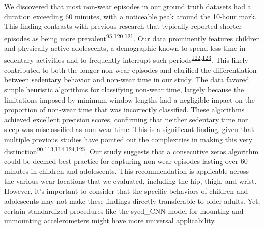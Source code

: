 \documentclass[
  9pt,
]{scrbook}
\begin{document}
We discovered that most non-wear episodes in our ground truth datasets
had a duration exceeding 60 minutes, with a noticeable peak around the
10-hour mark. This finding contrasts with previous research that
typically reported shorter episodes as being more
prevalent\textsuperscript{\protect\hyperlink{ref-jaeschke_variability_2018}{95},\protect\hyperlink{ref-aadland_comparison_2018}{120},\protect\hyperlink{ref-hutto_identifying_2013}{121}}.
Our data prominently features children and physically active
adolescents, a demographic known to spend less time in sedentary
activities and to frequently interrupt such
periods\textsuperscript{\protect\hyperlink{ref-cooper_objectively_2015}{122},\protect\hyperlink{ref-kwon_breaks_2012}{123}}.
This likely contributed to both the longer non-wear episodes and
clarified the differentiation between sedentary behavior and non-wear
time in our study. The data favored simple heuristic algorithms for
classifying non-wear time, largely because the limitations imposed by
minimum window lengths had a negligible impact on the proportion of
non-wear time that was incorrectly classified. These algorithms achieved
excellent precision scores, confirming that neither sedentary time nor
sleep was misclassified as non-wear time. This is a significant finding,
given that multiple previous studies have pointed out the complexities
in making this very
distinction\textsuperscript{\protect\hyperlink{ref-barouni_ambulatory_2020}{90},\protect\hyperlink{ref-troiano_physical_2008}{113},\protect\hyperlink{ref-choi_validation_2011}{114},\protect\hyperlink{ref-duncan_wear-time_2018}{124},\protect\hyperlink{ref-doherty_large_2017}{125}}.
Our study suggests that a consecutive zeros algorithm could be deemed
best practice for capturing non-wear episodes lasting over 60 minutes in
children and adolescents. This recommendation is applicable across the
various wear locations that we evaluated, including the hip, thigh, and
wrist. However, it's important to consider that the specific behaviors
of children and adolescents may not make these findings directly
transferable to older adults. Yet, certain standardized procedures like
the syed\_CNN model for mounting and unmounting accelerometers might
have more universal applicability.
\end{document}
